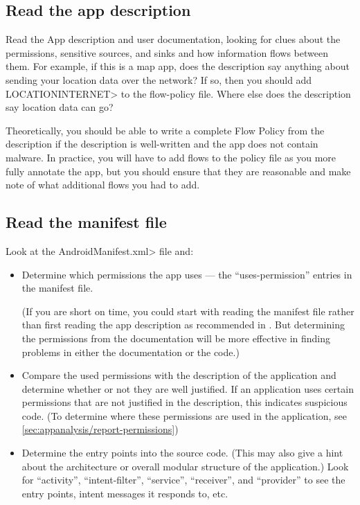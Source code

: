 \subsection{Read the app description}
\label{sec:read-the-app-description}

Read the App description and user documentation, looking for clues about
the permissions, sensitive sources, and sinks and how information
flows between them.  For example,
if this is a map app, does the description say anything about sending your location data over the
 network?  If so, then you should add \<LOCATION\flowsto INTERNET> to the flow-policy file.  Where
else does the description say location data can go?   

Theoretically, you should be able to write a complete Flow Policy from the
description if the description is well-written and the app does not contain
malware.  In practice, you will have to add flows to the policy file as you
more fully annotate the app, but you should ensure that they are reasonable
and make note of what additional flows you had to add.
 

\subsection{Read the manifest file}

Look at the \<AndroidManifest.xml> file and:
\begin{itemize}
\item Determine which permissions the app uses --- the ``uses-permission''
  entries in the manifest file.

  (If you are short on time, you could start with reading the manifest file
  rather than first reading the app description as recommended in
  .  But determining the permissions
  from the documentation will be more effective in finding problems in
  either the documentation or the code.)
\item Compare the used permissions with the description of the
  application and determine whether or not they are well justified.
  If an application uses certain permissions that are not justified
  in the description, this indicates suspicious code. 
  (To determine where these permissions are used in the application,
   see \ref{sec:appanalysis/report-permissions})


\item Determine the entry points into the source code. (This may also give
  a hint about the architecture or overall modular structure of the
  application.)
  Look for ``activity'', ``intent-filter'', ``service'', ``receiver'', and
  ``provider'' to see the entry points, intent messages it responds to,
  etc.

\end{itemize}



